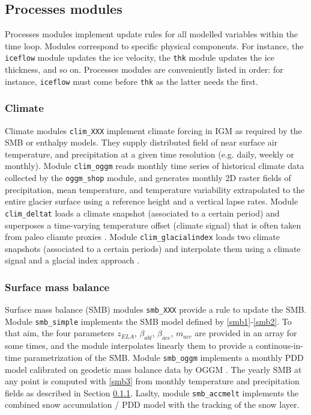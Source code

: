 \documentclass[gmd]{copernicus}
\begin{document}
\subsection{Processes modules}

Processes modules implement update rules for all modelled variables within the time loop. Modules correspond to specific physical components. For instance, the \texttt{iceflow} module updates the ice velocity, the \texttt{thk} module updates the ice thickness, and so on. Processes modules are conveniently listed in order: for instance, \texttt{iceflow} must come before \texttt{thk} as the latter needs the first.

\subsubsection{Climate}
\label{module_climate}

Climate modules \texttt{clim\_XXX} implement climate forcing in IGM as required by the SMB or enthalpy models. They supply distributed field of near surface air temperature, and precipitation at a given time resolution (e.g. daily, weekly or monthly). Module \texttt{clim\_oggm} reads monthly time series of historical climate data collected by the \texttt{oggm\_shop} module, and generates monthly 2D raster fields of precipitation, mean temperature, and temperature variability extrapolated to the entire glacier surface using a reference height and a vertical lapse rates. Module \texttt{clim\_deltat} loads a climate snapshot (associated to a certain period) and superposes a time-varying temperature offset (climate signal) that is often taken from paleo cliamte proxies \citep{seguinot2018modelling}. Module \texttt{clim\_glacialindex} loads two climate snapshots (associated to a certain periods) and interpolate them using a climate signal and a glacial index approach \citep{jouvet2023coupled}.

\subsubsection{Surface mass balance}
\label{module_smb}

Surface mass balance (SMB) modules \texttt{smb\_XXX} provide a rule to update the SMB. Module \texttt{smb\_simple} implements the SMB model defined by \eqref{smb1}-\eqref{smb2}. To that aim, the four parameters $z_{ELA}$, $\beta_{abl}$, $\beta_{acc}$, $m_{acc}$ are provided in an array for some times, and the module interpolates linearly them to provide a continous-in-time parametrization of the SMB. Module \texttt{smb\_oggm} implements a monthly PDD model calibrated on geodetic mass balance data \citep{hugonnet2021accelerated} by OGGM \citep{maussion2019open}. The yearly SMB at any point is computed with \eqref{smb3} from monthly temperature and precipitation fields as described in Section \ref{module_climate}. Laslty, module \texttt{smb\_accmelt} implements the combined snow accumulation / PDD model with the tracking of the snow layer.
 
\end{document}
